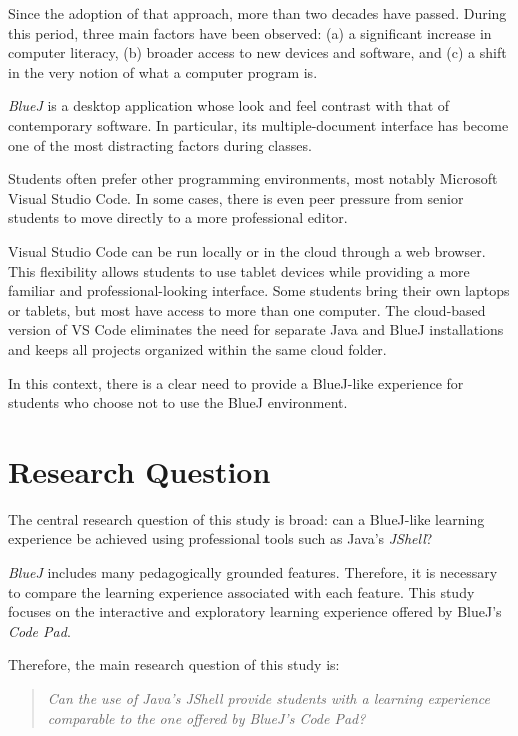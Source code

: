 \documentclass{article}
\begin{document}
Since the adoption of that approach, more than two decades have passed. During this period, three main factors have been observed: (a) a significant increase in computer literacy, (b) broader access to new devices and software, and (c) a shift in the very notion of what a computer program is.

\textit{BlueJ} is a desktop application whose look and feel contrast with that of contemporary software. In particular, its multiple-document interface has become one of the most distracting factors during classes.

Students often prefer other programming environments, most notably Microsoft Visual Studio Code. In some cases, there is even peer pressure from senior students to move directly to a more professional editor.


Visual Studio Code can be run locally or in the cloud through a web browser. This flexibility allows students to use tablet devices while providing a more familiar and professional-looking interface. Some students bring their own laptops or tablets, but most have access to more than one computer. The cloud-based version of VS Code eliminates the need for separate Java and BlueJ installations and keeps all projects organized within the same cloud folder.

In this context, there is a clear need to provide a BlueJ-like experience for students who choose not to use the BlueJ environment.

\section{Research Question}

The central research question of this study is broad: can a BlueJ-like learning experience be achieved using professional tools such as Java’s \textit{JShell}?

\textit{BlueJ} includes many pedagogically grounded features. Therefore, it is necessary to compare the learning experience associated with each feature. This study focuses on the interactive and exploratory learning experience offered by BlueJ’s \textit{Code Pad}.

Therefore, the main research question of this study is:

\begin{quote}
\textit{Can the use of Java’s JShell provide students with a learning experience comparable to the one offered by BlueJ’s Code Pad?}
\end{quote}
\end{document}
